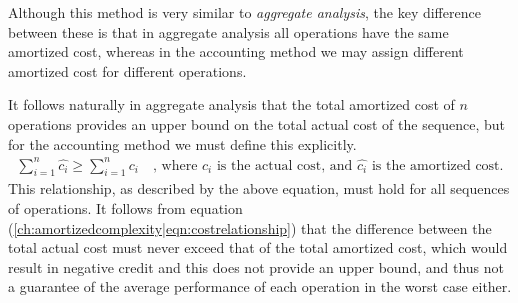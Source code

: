 Although this method is very similar to \textit{aggregate analysis}, the key
difference between these is that in aggregate analysis all operations have
the same amortized cost, whereas in the accounting method we may assign
different amortized cost for different operations.

It follows naturally in aggregate analysis that the total amortized cost of
$n$ operations provides an upper bound on the total actual cost of the
sequence, but for the accounting method we must define this explicitly.
\begin{align}
\label{ch:amortizedcomplexity|eqn:costrelationship}
	\sum_{i=1}^{n}{\hat{c_i}} \geq \sum_{i=1}^{n}{c_i}
	\quad \text{, where }c_i\text{ is the actual cost, and }
	\hat{c_i}\text{ is the amortized cost.}
\end{align}
This relationship, as described by the above equation, must hold for all
sequences of operations. It follows from equation
(\ref{ch:amortizedcomplexity|eqn:costrelationship}) that the difference
between the total actual cost must never exceed that of the total amortized
cost, which would result in negative credit and this does not provide an upper
bound, and thus not a guarantee of the average performance of each operation
in the worst case either.

